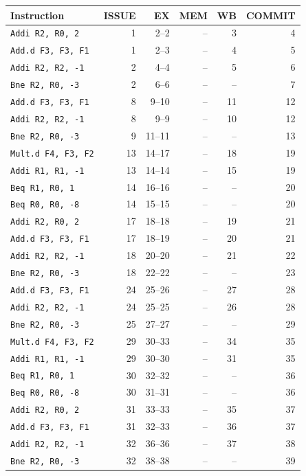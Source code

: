 \begin{tabular}{@{}lrrrrr@{}}\toprule
Instruction & ISSUE & EX & MEM & WB & COMMIT\\\midrule
\texttt{Addi R2, R0, 2} & 1 & 2--2 & -- & 3 & 4 \\
\texttt{Add.d F3, F3, F1} & 1 & 2--3 & -- & 4 & 5 \\
\texttt{Addi R2, R2, -1} & 2 & 4--4 & -- & 5 & 6 \\
\texttt{Bne R2, R0, -3} & 2 & 6--6 & -- & -- & 7 \\
\texttt{Add.d F3, F3, F1} & 8 & 9--10 & -- & 11 & 12 \\
\texttt{Addi R2, R2, -1} & 8 & 9--9 & -- & 10 & 12 \\
\texttt{Bne R2, R0, -3} & 9 & 11--11 & -- & -- & 13 \\
\texttt{Mult.d F4, F3, F2} & 13 & 14--17 & -- & 18 & 19 \\
\texttt{Addi R1, R1, -1} & 13 & 14--14 & -- & 15 & 19 \\
\texttt{Beq R1, R0, 1} & 14 & 16--16 & -- & -- & 20 \\
\texttt{Beq R0, R0, -8} & 14 & 15--15 & -- & -- & 20 \\
\texttt{Addi R2, R0, 2} & 17 & 18--18 & -- & 19 & 21 \\
\texttt{Add.d F3, F3, F1} & 17 & 18--19 & -- & 20 & 21 \\
\texttt{Addi R2, R2, -1} & 18 & 20--20 & -- & 21 & 22 \\
\texttt{Bne R2, R0, -3} & 18 & 22--22 & -- & -- & 23 \\
\texttt{Add.d F3, F3, F1} & 24 & 25--26 & -- & 27 & 28 \\
\texttt{Addi R2, R2, -1} & 24 & 25--25 & -- & 26 & 28 \\
\texttt{Bne R2, R0, -3} & 25 & 27--27 & -- & -- & 29 \\
\texttt{Mult.d F4, F3, F2} & 29 & 30--33 & -- & 34 & 35 \\
\texttt{Addi R1, R1, -1} & 29 & 30--30 & -- & 31 & 35 \\
\texttt{Beq R1, R0, 1} & 30 & 32--32 & -- & -- & 36 \\
\texttt{Beq R0, R0, -8} & 30 & 31--31 & -- & -- & 36 \\
\texttt{Addi R2, R0, 2} & 31 & 33--33 & -- & 35 & 37 \\
\texttt{Add.d F3, F3, F1} & 31 & 32--33 & -- & 36 & 37 \\
\texttt{Addi R2, R2, -1} & 32 & 36--36 & -- & 37 & 38 \\
\texttt{Bne R2, R0, -3} & 32 & 38--38 & -- & -- & 39 \\

\end{tabular}
